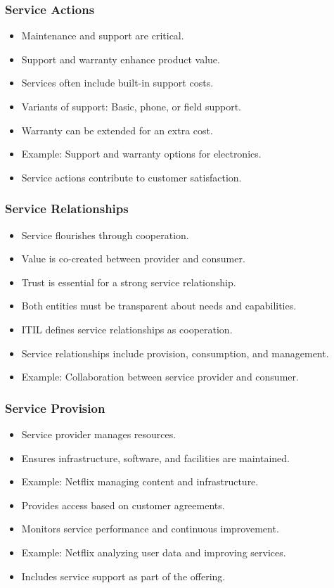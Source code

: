 \documentclass[aspectratio=169, table]{beamer}
\begin{document}
\begin{frame}
	\frametitle{Service Actions}
	\begin{itemize}
		\item Maintenance and support are critical.
		\item Support and warranty enhance product value.
		\item Services often include built-in support costs.
		\item Variants of support: Basic, phone, or field support.
		\item Warranty can be extended for an extra cost.
		\item Example: Support and warranty options for electronics.
		\item Service actions contribute to customer satisfaction.
	\end{itemize}
\end{frame}

\begin{frame}
	\frametitle{Service Relationships}
	\begin{itemize}
		\item Service flourishes through cooperation.
		\item Value is co-created between provider and consumer.
		\item Trust is essential for a strong service relationship.
		\item Both entities must be transparent about needs and capabilities.
		\item ITIL defines service relationships as cooperation.
		\item Service relationships include provision, consumption, and management.
		\item Example: Collaboration between service provider and consumer.
	\end{itemize}
\end{frame}

\begin{frame}
	\frametitle{Service Provision}
	\begin{itemize}
		\item Service provider manages resources.
		\item Ensures infrastructure, software, and facilities are maintained.
		\item Example: Netflix managing content and infrastructure.
		\item Provides access based on customer agreements.
		\item Monitors service performance and continuous improvement.
		\item Example: Netflix analyzing user data and improving services.
		\item Includes service support as part of the offering.
	\end{itemize}
\end{frame}
\end{document}
